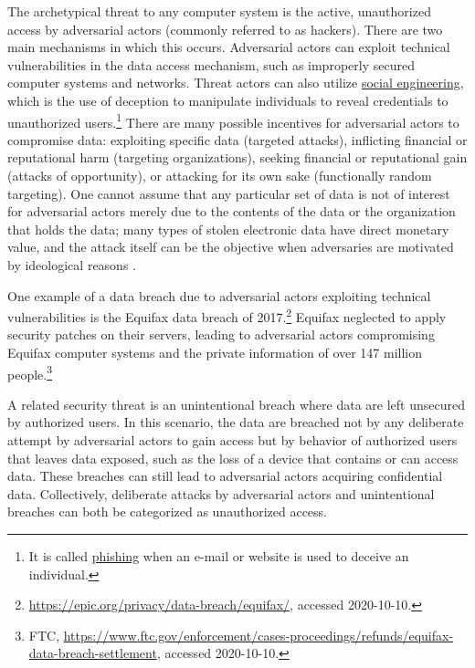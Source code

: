 The archetypical threat to any computer system is the active, unauthorized access by adversarial actors (commonly referred to as hackers). There are two main mechanisms in which this occurs. Adversarial actors can exploit technical vulnerabilities in the data access mechanism, such as improperly secured computer systems and networks. Threat actors can also utilize \href{https://csrc.nist.gov/glossary/term/social_engineering}{social engineering}, which is the use of deception to manipulate individuals to reveal credentials to unauthorized users.\footnote{It is called \href{https://csrc.nist.gov/glossary/term/phishing}{phishing} when an e-mail or website is used to deceive an individual.} There are many possible incentives for adversarial actors to compromise data: exploiting specific data (targeted attacks), inflicting financial or reputational harm (targeting organizations), seeking financial or reputational gain (attacks of opportunity), or attacking for its own sake (functionally random targeting). One cannot assume that any particular set of data is not of interest for adversarial actors merely due to the contents of the data or the organization that holds the data; many types of stolen electronic data have direct monetary value, and the attack itself can be the objective when adversaries are motivated by ideological reasons \citep{ablon2018}.


\begin{bbox}

One example of a data breach due to adversarial actors exploiting technical vulnerabilities is the Equifax data breach of 2017.\footnote{\url{https://epic.org/privacy/data-breach/equifax/}, accessed 2020-10-10.} Equifax neglected to apply security patches on their servers, leading to adversarial actors compromising Equifax computer systems and the private information of over 147 million people.\footnote{FTC, \url{https://www.ftc.gov/enforcement/cases-proceedings/refunds/equifax-data-breach-settlement}, accessed 2020-10-10.}

\end{bbox}


A related security threat is an unintentional breach where data are left unsecured by authorized users. In this scenario, the data are breached not by any deliberate attempt by adversarial actors to gain access but by behavior of authorized users that leaves data exposed, such as the loss of a device that contains or can access data. These breaches can still lead to adversarial actors acquiring confidential data. Collectively, deliberate attacks by adversarial actors and unintentional breaches can both be categorized as unauthorized access.

